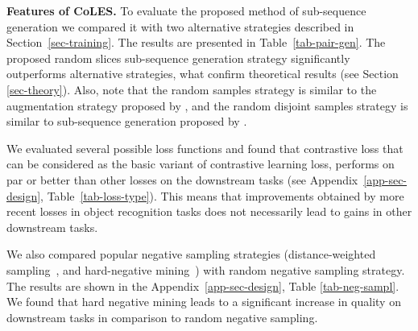 \documentclass[sigconf]{acmart}
\begin{document}
\textbf{Features of CoLES.} To evaluate the proposed method of sub-sequence generation we compared it with two alternative strategies described in Section~\ref{sec-training}. The results are presented in Table~\ref{tab-pair-gen}. The proposed random slices sub-sequence generation strategy significantly outperforms alternative strategies, what confirm theoretical results (see Section \ref{sec-theory}). Also, note that the random samples strategy is similar to the augmentation strategy proposed by \cite{Yao2020SelfsupervisedLF}, and the random disjoint samples strategy is similar to sub-sequence generation proposed by \cite{Ma2020DisentangledSI}.

We evaluated several possible loss functions and found that contrastive loss that can be considered as the basic variant of contrastive learning loss, performs on par or better than other losses on the downstream tasks (see Appendix~\ref{app-sec-design}, Table~\ref{tab-loss-type}). This means that improvements obtained by more recent losses in object recognition tasks does not necessarily lead to gains in other downstream tasks.

We also compared popular negative sampling strategies (distance-weighted sampling~\citep{Manmatha2017SamplingMI}, and hard-negative mining~\citep{Schroff2015FaceNetAU}) with random negative sampling strategy. The results are shown in the Appendix~\ref{app-sec-design}, Table \ref{tab-neg-sampl}. We found that hard negative mining leads to a significant increase in quality on downstream tasks in comparison to random negative sampling.
\end{document}
